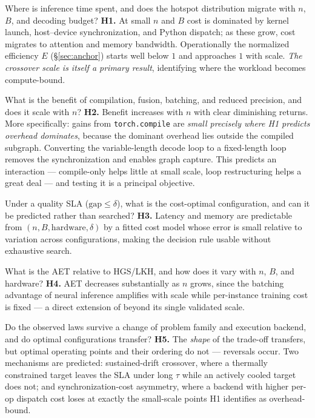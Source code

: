 \documentclass[11pt,a4paper,twocolumn]{article}
\begin{document}
\begin{description}[leftmargin=0pt]

\item[\textbf{RQ1} --- Characterization.] Where is inference time spent, and does
the hotspot distribution migrate with $n$, $B$, and decoding budget?
\textbf{H1.} At small $n$ and $B$ cost is dominated by kernel launch,
host--device synchronization, and Python dispatch; as these grow, cost migrates to
attention and memory bandwidth. Operationally the normalized efficiency $E$
(\S\ref{sec:anchor}) starts well below $1$ and approaches $1$ with scale.
\emph{The crossover scale is itself a primary result}, identifying where the
workload becomes compute-bound.

\item[\textbf{RQ2} --- Optimization headroom.] What is the benefit of compilation,
fusion, batching, and reduced precision, and does it scale with $n$?
\textbf{H2.} Benefit increases with $n$ with clear diminishing returns. More
specifically: gains from \texttt{torch.compile} are \emph{small precisely where H1
predicts overhead dominates}, because the dominant overhead lies outside the
compiled subgraph. Converting the variable-length decode loop to a fixed-length
loop removes the synchronization and enables graph capture. This predicts an
interaction --- compile-only helps little at small scale, loop restructuring helps a
great deal --- and testing it is a principal objective.

\item[\textbf{RQ3} --- Deployment configuration.] Under a quality SLA
($\mathrm{gap} \le \delta$), what is the cost-optimal configuration, and can it be
predicted rather than searched? \textbf{H3.} Latency and memory are predictable
from $(n, B, \text{hardware}, \delta)$ by a fitted cost model whose error is small
relative to variation across configurations, making the decision rule usable
without exhaustive search.

\item[\textbf{RQ4} --- Amortized efficiency.] What is the AET relative to HGS/LKH,
and how does it vary with $n$, $B$, and hardware? \textbf{H4.} AET decreases
substantially as $n$ grows, since the batching advantage of neural inference
amplifies with scale while per-instance training cost is fixed --- a direct
extension of \citep{aet2026} beyond its single validated scale.

\item[\textbf{RQ5} --- Generalization.] Do the observed laws survive a change of
problem family and execution backend, and do optimal configurations transfer?
\textbf{H5.} The \emph{shape} of the trade-off transfers, but optimal operating
points and their ordering do not --- reversals occur. Two mechanisms are
predicted: sustained-drift crossover, where a thermally constrained target leaves
the SLA under long $\tau$ while an actively cooled target does not; and
synchronization-cost asymmetry, where a backend with higher per-op dispatch cost
loses at exactly the small-scale points H1 identifies as overhead-bound.

\end{description}
\end{document}
